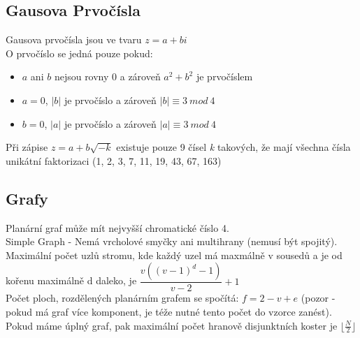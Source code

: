 \documentclass[11pt]{article}
\begin{document}
\subsection{Gausova Prvočísla}
Gausova prvočísla jsou ve tvaru $z=a+b\textit{i}$
\\O prvočíslo se jedná pouze pokud:
\begin{itemize}
\item $a$ ani $b$ nejsou rovny 0 a zároveň $a^2+b^2$ je prvočíslem
\item $a = 0$, $|b|$ je prvočíslo a zároveň $|b|\equiv 3\ mod\ 4$ 
\item $b = 0$, $|a|$ je prvočíslo a zároveň $|a|\equiv 3\ mod\ 4$
\end{itemize}
Při zápise $z=a+b\sqrt{-k}$ existuje pouze 9 čísel \textit{k} takových, že mají všechna čísla unikátní faktorizaci (1, 2, 3, 7, 11, 19, 43, 67, 163)
\subsection{Grafy}
Planární graf může mít nejvyšší chromatické číslo 4.
\\Simple Graph - Nemá vrcholové smyčky ani multihrany (nemusí být spojitý).
\\Maximální počet uzlů stromu, kde každý uzel má maxmálně \textsf{v} sousedů a je od kořenu maximálně \textsf{d} daleko, je $\dfrac{v((v-1)^d-1)}{v-2}+1$
\\Počet ploch, rozdělených planárním grafem se spočítá: $f=2-v+e$ (pozor - pokud má graf více komponent, je téže nutné tento počet do vzorce zanést).
\\Pokud máme úplný graf, pak maximální počet hranově disjunktních koster je $\lfloor\frac{N}{2}\rfloor$
\end{document}
